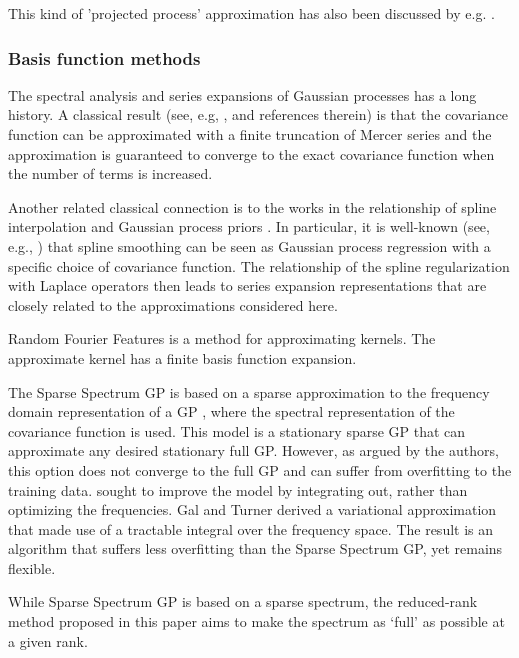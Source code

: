 \documentclass[]{interact}
\theoremstyle{plain}%
\theoremstyle{definition}
\theoremstyle{remark}
\begin{document}
This kind of 'projected process' approximation has also been discussed by e.g. \cite{banerjee2008gaussian}.


\subsubsection{Basis function methods}

The spectral analysis and series expansions of Gaussian processes has a long history. A classical result (see, e.g, \cite{loeve1977probability,trees1968detection,adler1981geometry,cramer2013stationary}, and references therein) is that the covariance function can be approximated with a finite truncation of Mercer series and the approximation is guaranteed to converge to the exact covariance function when the number of terms is increased. 

Another related classical connection is to the works in the relationship of spline interpolation and Gaussian process priors \citep{wahba1978improper,kimeldorf1970correspondence,wahba1990spline}. In particular, it is well-known (see, e.g., \cite{wahba1990spline}) that spline smoothing can be seen as Gaussian process regression with a speciﬁc choice of covariance function. The relationship of the spline regularization with Laplace operators then leads to series expansion representations that are closely related to the approximations considered here. 

Random Fourier Features \citep{rahimi2008random,rahimi2009weighted} is a method for approximating kernels. The approximate kernel has a finite basis function expansion.

The Sparse Spectrum GP is based on a sparse approximation to the frequency domain representation of a GP \citep{lazaro2010sparse,quia2010sparse}, where the spectral representation of the covariance function is used. This model is a stationary sparse GP that can approximate any desired stationary full GP. However, as argued by the authors, this option does not converge to the full GP and can suffer from overfitting to the training data. \citep{gal2015improving} sought to improve the model by integrating out, rather than optimizing the frequencies.   Gal and Turner derived a variational approximation that made use of a tractable integral over the frequency space. The result is an  algorithm that suffers less overfitting than the Sparse Spectrum GP, yet remains flexible.

While Sparse Spectrum GP is based on a sparse spectrum, the reduced-rank method proposed in this paper aims to make the spectrum as ‘full’ as possible at a given rank.
\end{document}
